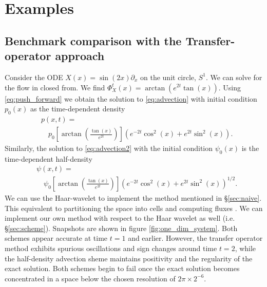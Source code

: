 \documentclass[letterpaper, 12 pt]{amsart}
\begin{document}
\section{Examples}
\label{sec:Examples}

\subsection{Benchmark comparison with the Transfer-operator approach}
Consider the ODE $X(x) = \sin(2x) \partial_x$ on the unit circle, $S^1$.
We can solve for the flow in closed from.  We find
$\Phi_X^t(x) = \arctan( e^{2t} \tan(x) )$.
Using \eqref{eq:push_forward}
we obtain the solution to \eqref{eq:advection} with initial condition $p_0(x)$ as the time-dependent density
\begin{align*}
  &p(x,t) = \\
  &\quad p_0\left[ \arctan \left( \frac{ \tan(x)}{e^{2t}} \right)\right]
  \left( e^{-2t} \cos^2(x) + e^{2t} \sin^2(x) \right).
\end{align*}
Similarly, the solution to \eqref{eq:advection2} with the initial condition $\psi_0(x)$ is the time-dependent half-density
\begin{align*}
  &\psi(x,t) = \\
  &\quad \psi_0\left[\arctan\left( \frac{ \tan(x)}{e^{2t}} \right) \right]
  \left( e^{-2t} \cos^2(x) + e^{2t} \sin^2(x) \right)^{1/2}. 
\end{align*}
We can use the Haar-wavelet to implement the method mentioned in \S \ref{sec:naive}.  This equivalent to partitioning the space into cells and computing fluxes \cite{FroylandJungeKoltai2013}.  We can implement our own method with respect to the Haar wavelet as well (i.e. \S \ref{sec:scheme}).  Snapshots are shown in figure \ref{fig:one_dim_system}.
Both schemes appear accurate at time $t=1$ and earlier.
However, the transfer operator method exhibits spurious oscillations and sign changes around time $t=2$,
 while the half-density advection sheme maintains positivity and the regularity of the exact solution.
Both schemes begin to fail once the exact solution becomes concentrated in a space below the chosen resolution of $2\pi \times 2^{-6}$.
\end{document}
